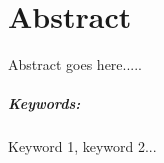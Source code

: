 \documentclass{standalone}
\begin{document}
\chapter*{Abstract}
Abstract goes here.....

\paragraph*{Keywords:}Keyword 1, keyword 2...
\end{document}
